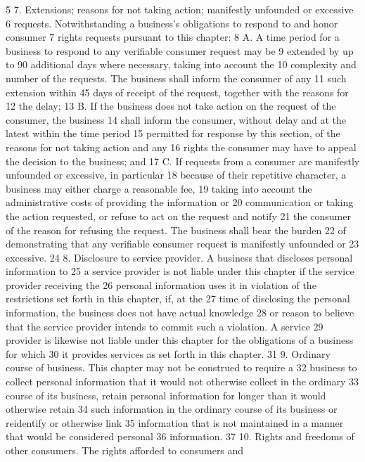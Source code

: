 5 7. Extensions; reasons for not taking action; manifestly unfounded or excessive
6 requests. Notwithstanding a business's obligations to respond to and honor consumer
7 rights requests pursuant to this chapter:
8 A. A time period for a business to respond to any verifiable consumer request may be
9 extended by up to 90 additional days where necessary, taking into account the
10 complexity and number of the requests. The business shall inform the consumer of any
11 such extension within 45 days of receipt of the request, together with the reasons for
12 the delay;
13 B. If the business does not take action on the request of the consumer, the business
14 shall inform the consumer, without delay and at the latest within the time period
15 permitted for response by this section, of the reasons for not taking action and any
16 rights the consumer may have to appeal the decision to the business; and
17 C. If requests from a consumer are manifestly unfounded or excessive, in particular
18 because of their repetitive character, a business may either charge a reasonable fee,
19 taking into account the administrative costs of providing the information or
20 communication or taking the action requested, or refuse to act on the request and notify
21 the consumer of the reason for refusing the request. The business shall bear the burden
22 of demonstrating that any verifiable consumer request is manifestly unfounded or
23 excessive.
24 8. Disclosure to service provider. A business that discloses personal information to
25 a service provider is not liable under this chapter if the service provider receiving the
26 personal information uses it in violation of the restrictions set forth in this chapter, if, at the
27 time of disclosing the personal information, the business does not have actual knowledge
28 or reason to believe that the service provider intends to commit such a violation. A service
29 provider is likewise not liable under this chapter for the obligations of a business for which
30 it provides services as set forth in this chapter.
31 9. Ordinary course of business. This chapter may not be construed to require a
32 business to collect personal information that it would not otherwise collect in the ordinary
33 course of its business, retain personal information for longer than it would otherwise retain
34 such information in the ordinary course of its business or reidentify or otherwise link
35 information that is not maintained in a manner that would be considered personal
36 information.
37 10. Rights and freedoms of other consumers. The rights afforded to consumers and
